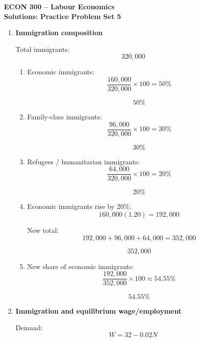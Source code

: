\documentclass[12pt]{article}
\begin{document}
\begin{center}
\Large \textbf{ECON 300 -- Labour Economics} \\[0.7em]
\large \textbf{Solutions: Practice Problem Set 5} \\[0.3em]

\end{center}

\vspace{1em}

\begin{enumerate}[label=\textbf{Question \arabic*.}]

\item \textbf{Immigration composition}

Total immigrants:
\[
320{,}000
\]

\begin{enumerate}[label=(\alph*)]
    \item Economic immigrants:
    \[
    \frac{160{,}000}{320{,}000}\times 100 = 50\%
    \]

    \[
    \boxed{50\%}
    \]

    \item Family-class immigrants:
    \[
    \frac{96{,}000}{320{,}000}\times 100 = 30\%
    \]

    \[
    \boxed{30\%}
    \]

    \item Refugees / humanitarian immigrants:
    \[
    \frac{64{,}000}{320{,}000}\times 100 = 20\%
    \]

    \[
    \boxed{20\%}
    \]

    \item Economic immigrants rise by \(20\%\):
    \[
    160{,}000(1.20)=192{,}000
    \]

    New total:
    \[
    192{,}000+96{,}000+64{,}000=352{,}000
    \]

    \[
    \boxed{352{,}000}
    \]

    \item New share of economic immigrants:
    \[
    \frac{192{,}000}{352{,}000}\times 100 \approx 54.55\%
    \]

    \[
    \boxed{54.55\%}
    \]
\end{enumerate}


\item \textbf{Immigration and equilibrium wage/employment}

Demand:
\[
W=32-0.02N
\]


\end{enumerate}
\end{document}
